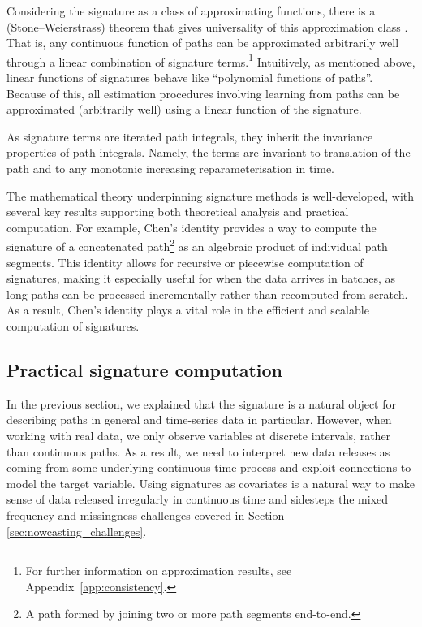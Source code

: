 \documentclass[a4paper, 12pt]{article}
\theoremstyle{remark}
\begin{document}
Considering the signature as a class of approximating functions, there is a (Stone--Weierstrass) theorem that gives universality of this approximation class \citep{levin2013learning}.
That is, any continuous function of paths can be approximated arbitrarily well through a linear combination of signature terms.\footnote{For further information on approximation results, see Appendix~\ref{app:consistency}.} Intuitively, as mentioned above, linear functions of signatures behave like ``polynomial functions of paths''. Because of this, all estimation procedures involving learning from paths can be approximated (arbitrarily well) using a linear function of the signature.

As signature terms are iterated path integrals, they inherit the invariance properties of path integrals. Namely, the terms are invariant to translation of the path and to any monotonic increasing reparameterisation in time.

The mathematical theory underpinning signature methods is well-developed, with several key results supporting both theoretical analysis and practical computation. For example, Chen's identity \citep{chen1954iterated} provides a way to compute the signature of a concatenated path\footnote{A path formed by joining two or more path segments end-to-end.} as an algebraic product of individual path segments.
This identity allows for recursive or piecewise computation of signatures, making it especially useful for when the data arrives in batches, as long paths can be processed incrementally rather than recomputed from scratch. As a result, Chen's identity plays a vital role in the efficient and scalable computation of signatures.

\subsection{Practical signature computation}\label{sec:practicalsig}


In the previous section, we explained that the signature is a natural object for describing paths in general and time-series data in particular. However, when working with real data, we only observe variables at discrete intervals, rather than continuous paths. As a result, we need to interpret new data releases as coming from some underlying continuous time process and exploit connections to model the target variable. Using signatures as covariates is a natural way to make sense of data released irregularly in continuous time and sidesteps the mixed frequency and missingness challenges covered in Section \ref{sec:nowcasting_challenges}. 
\end{document}
